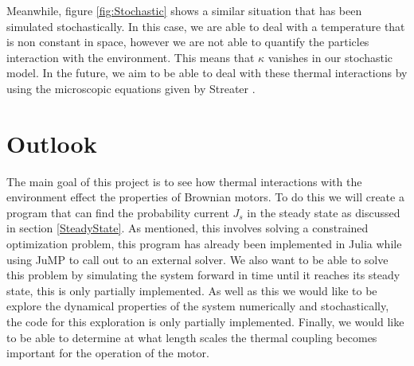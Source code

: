 \documentclass[11pt]{article} %
\begin{document}
Meanwhile, figure \ref{fig:Stochastic} shows a similar situation that has been simulated stochastically. In this case, we  are able to deal with a temperature that is non constant in space, however we are not able to quantify the particles interaction with the environment. This means that $\kappa$ vanishes in our stochastic model. In the future, we aim to be able to deal with these thermal interactions by using the microscopic equations given by Streater \cite{Streater1997, Streater1997a}.



\section{Outlook}
The main goal of this project is to see how thermal interactions with the environment effect the properties of Brownian motors. To do this we will create a program that can find the probability current $J_s$ in the steady state as discussed in section \ref{SteadyState}. As mentioned, this involves solving a constrained optimization problem, this program has already been implemented in Julia \cite{Bezanson2014} while using JuMP \cite{DunningHuchetteLubin2015} to call out to an external solver. We also want to be able to solve this problem by simulating the system forward in time until it reaches its steady state, this is only partially implemented. As well as this we would like to be explore the dynamical properties of the system numerically and stochastically, the code for this exploration is only partially implemented. Finally, we would like to be able to determine at what length scales the thermal coupling becomes important for the operation of the motor.





\clearpage{}   %
{} %


\end{document}
